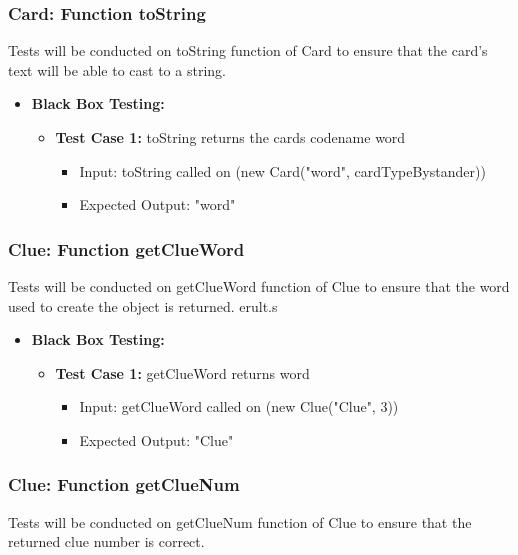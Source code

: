 \documentclass[12pt]{article}
\begin{document}

\subsubsection{Card: Function toString}
Tests will be conducted on toString function of Card to ensure that the card's text will be able to cast to a string.

\begin{itemize}
    \item \textbf{Black Box Testing:}
    \begin{itemize}
    \item \textbf{Test Case 1:} toString returns the cards codename word
            \begin{itemize}
            \item Input: toString called on (new Card("word", cardTypeBystander))
            \item Expected Output: "word"
        \end{itemize}
    \end{itemize}
\end{itemize}


\subsubsection{Clue: Function getClueWord}
Tests will be conducted on getClueWord function of Clue to ensure that the word used to create the object is returned.
erult.s
\begin{itemize}
    \item \textbf{Black Box Testing:}
    \begin{itemize}
    \item \textbf{Test Case 1:} getClueWord returns word
            \begin{itemize}
            \item Input: getClueWord called on (new Clue("Clue", 3))
            \item Expected Output: "Clue"
        \end{itemize}
    \end{itemize}
\end{itemize}

\subsubsection{Clue: Function getClueNum}
Tests will be conducted on getClueNum function of Clue to ensure that the returned clue number is correct.
\end{document}
